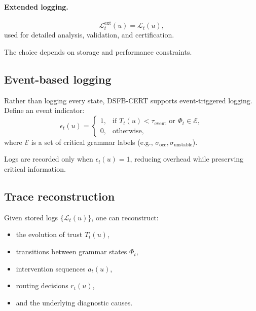 \documentclass[11pt,letterpaper]{article}
\theoremstyle{gcresult}
\theoremstyle{definition}
\begin{document}
\paragraph{Extended logging.}
\begin{equation}
\mathcal{L}^{\mathrm{ext}}_t(u)=\mathcal{L}_t(u),
\end{equation}
used for detailed analysis, validation, and certification.

The choice depends on storage and performance constraints.


\subsection{Event-based logging}

Rather than logging every state, DSFB-CERT supports event-triggered logging. Define an event indicator:
\begin{equation}
\epsilon_t(u)=
\begin{cases}
1, & \text{if } T_t(u)<\tau_{\mathrm{event}} \text{ or } \Phi_t\in\mathcal{E},\\
0, & \text{otherwise},
\end{cases}
\end{equation}
where $\mathcal{E}$ is a set of critical grammar labels (e.g., $\sigma_{\mathrm{occ}},\sigma_{\mathrm{unstable}}$).

Logs are recorded only when $\epsilon_t(u)=1$, reducing overhead while preserving critical information.


\subsection{Trace reconstruction}

Given stored logs $\{\mathcal{L}_t(u)\}$, one can reconstruct:
\begin{itemize}[leftmargin=1.5em]
    \item the evolution of trust $T_t(u)$,
    \item transitions between grammar states $\Phi_t$,
    \item intervention sequences $a_t(u)$,
    \item routing decisions $r_t(u)$,
    \item and the underlying diagnostic causes.
\end{itemize}
\end{document}
